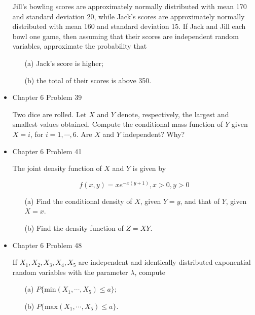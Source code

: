 \documentclass[11pt]{article}
\begin{document}
\begin{itemize}
    Jill's bowling scores are approximately normally distributed with mean 170 and standard deviation 20, while Jack's scores are approximately normally distributed with mean 160 and standard deviation 15. If Jack and Jill each bowl one game, then assuming that their scores are independent random variables, approximate the probability that
    
    \begin{itemize}
    \item[(a)] Jack's score is higher;
    \item[(b)] the total of their scores is above 350.
    \end{itemize}
    
    \item 
    Chapter 6 Problem 39
    
    Two dice are rolled. Let $X$ and $Y$ denote, respectively, the largest and smallest values obtained. Compute the conditional mass function of $Y$ given $X = i$, for $i = 1, \cdots, 6$. Are $X$ and $Y$ independent? Why?
    
    \item 
    Chapter 6 Problem 41
    
    The joint density function of $X$ and $Y$ is given by
    
    $$
    f(x, y) = xe^{-x(y+1)}, x > 0, y > 0
    $$
    
    \begin{itemize}
    \item[(a)] Find the conditional density of $X$, given $Y = y$, and that of $Y$, given $X = x$.
    \item[(b)] Find the density function of $Z = XY$.
    \end{itemize}
    
    \item 
    Chapter 6 Problem 48
    
    If $X_1, X_2, X_3, X_4, X_5$ are independent and identically distributed exponential random variables with the parameter $\lambda$, compute
    
    \begin{itemize}
    \item[(a)] $P\{\textrm{min}(X_1, \cdots, X_5) \leq a\}$;
    \item[(b)] $P\{\textrm{max}(X_1, \cdots, X_5) \leq a\}$.
    \end{itemize}


%
%


\end{itemize}
\end{document}
